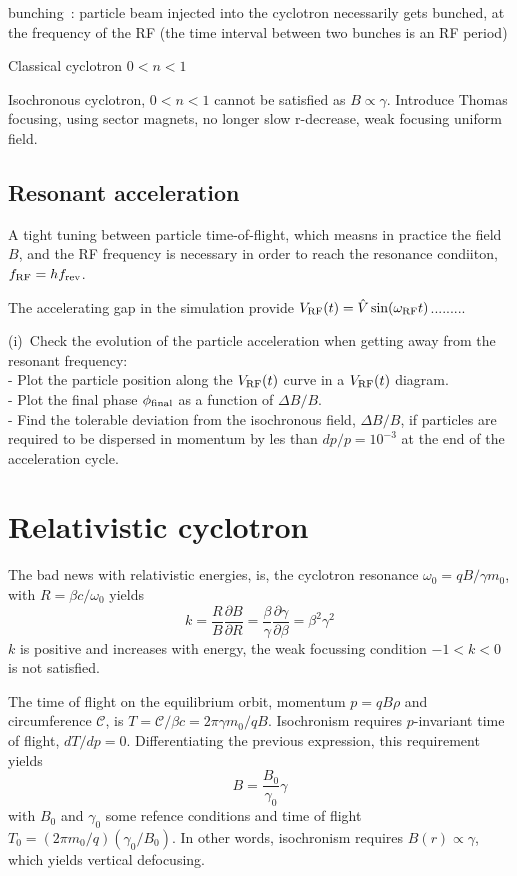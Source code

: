      bunching~: particle beam injected into the cyclotron necessarily gets bunched, at the 
frequency of the RF (the time interval between two bunches is an RF period)




Classical cyclotron $0<n<1$


Isochronous cyclotron, $0<n<1$ cannot be satisfied as $B\propto \gamma$. Introduce Thomas focusing, using sector magnets,
no longer slow r-decrease, weak focusing uniform field.



\subsection{Resonant acceleration}

A tight tuning between particle time-of-flight, which measns in practice the 
field $B$, and the RF frequency is necessary in order to reach the 
resonance condiiton, $f_{\rm RF} = h f_{\rm rev}$.

The accelerating gap in the simulation provide $V_{\rm RF}(t) = \hat V \sin (\omega_{\rm RF} t)$......... 

(i)~Check the evolution of the particle acceleration when 
 getting away from the resonant frequency: \\
- Plot the particle position along the $V_{\rm RF}(t)$ curve in a $V_{\rm RF}(t)$ diagram. \\
- Plot the final phase $\phi_{\rm final}$ as a function of $\Delta B/B$. \\
- Find the tolerable deviation from the isochronous field, 
$\Delta B/B$,  if particles are required to be dispersed in momentum by les 
than $dp/p=10^{-3}$ at the end of the acceleration cycle.




\section{Relativistic cyclotron \label{secCycloRel}}

The bad news with relativistic energies, is, 
the cyclotron resonance $\omega_0 = qB/\gamma m_0$, with $R = \beta c / \omega_0$  yields  
       $$k = \frac{R}{B}\frac{\partial B}{\partial R} = \frac{\beta}{\gamma} 
  \frac{\partial \gamma}{\partial \beta} = \beta^2 \gamma^2 $$
$k$ is positive and increases with energy, 
 the weak focussing condition $-1<k<0$ is not satisfied. 

The time of flight on the equilibrium orbit, momentum $p = qB\rho$ and circumference $\mathcal{C}$, is 
$T =  \mathcal{C}/ \beta c = 2\pi \gamma m_0 / qB$. 
    Isochronism requires $p$-invariant time of flight, $dT/dp=0$. Differentiating the previous expression,
this requirement yields 
$$B = \frac{B_0}{\gamma_0} \gamma$$
with $B_0$ and $\gamma_0$  some refence conditions and time of flight $T_0 = (2\pi m_0/q)(\gamma_0/B_0)$.
In other words, isochronism requires $ B(r) \propto \gamma$, which yields vertical defocusing. 

